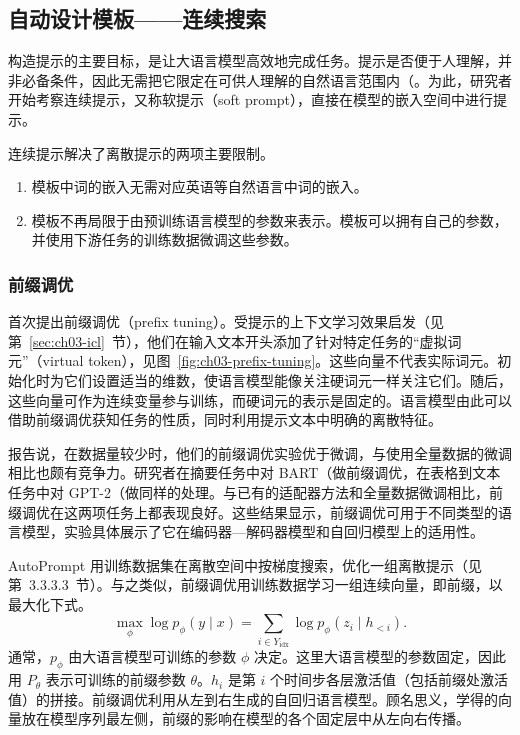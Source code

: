 \subsection{自动设计模板——连续搜索}
构造提示的主要目标，是让大语言模型高效地完成任务。提示是否便于人理解，并非必备条件，因此无需把它限定在可供人理解的自然语言范围内（。为此，研究者开始考察连续提示，又称软提示（soft prompt），直接在模型的嵌入空间中进行提示。

\begin{keypoint}
连续提示解决了离散提示的两项主要限制。
\begin{enumerate}
\item 模板中词的嵌入无需对应英语等自然语言中词的嵌入。
\item 模板不再局限于由预训练语言模型的参数来表示。模板可以拥有自己的参数，并使用下游任务的训练数据微调这些参数。
\end{enumerate}
\end{keypoint}

\subsubsection{前缀调优}
首次提出前缀调优（prefix tuning）。受提示的上下文学习效果启发（见第~\ref{sec:ch03-icl}~节），他们在输入文本开头添加了针对特定任务的“虚拟词元”（virtual token），见图~\ref{fig:ch03-prefix-tuning}。这些向量不代表实际词元。初始化时为它们设置适当的维数，使语言模型能像关注硬词元一样关注它们。随后，这些向量可作为连续变量参与训练，而硬词元的表示是固定的。语言模型由此可以借助前缀调优获知任务的性质，同时利用提示文本中明确的离散特征。

报告说，在数据量较少时，他们的前缀调优实验优于微调，与使用全量数据的微调相比也颇有竞争力。研究者在摘要任务中对 BART（做前缀调优，在表格到文本任务中对 GPT-2（做同样的处理。与已有的适配器方法和全量数据微调相比，前缀调优在这两项任务上都表现良好。这些结果显示，前缀调优可用于不同类型的语言模型，实验具体展示了它在编码器—解码器模型和自回归模型上的适用性。

AutoPrompt 用训练数据集在离散空间中按梯度搜索，优化一组离散提示（见第~3.3.3.3~节）。与之类似，前缀调优用训练数据学习一组连续向量，即前缀，以最大化下式。
\begin{equation}
\max_{\phi}\log p_{\phi}(y\mid x)
  =\sum_{i\in Y_{\mathrm{idx}}}\log p_{\phi}(z_i\mid h_{<i}).
\tag{3.12}\label{eq:ch03-prefix-objective}
\end{equation}
通常，$p_{\phi}$ 由大语言模型可训练的参数 $\phi$ 决定。这里大语言模型的参数固定，因此用 $P_{\theta}$ 表示可训练的前缀参数 $\theta$。$h_i$ 是第 $i$ 个时间步各层激活值（包括前缀处激活值）的拼接。前缀调优利用从左到右生成的自回归语言模型。顾名思义，学得的向量放在模型序列最左侧，前缀的影响在模型的各个固定层中从左向右传播。

